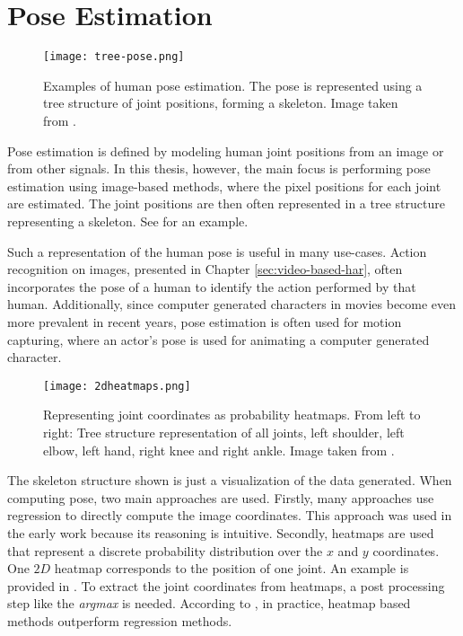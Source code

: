 \section{Pose Estimation}

\begin{figure}[htb!]
    \centering
    \texttt{[image: tree-pose.png]}
    \caption{Examples of human pose estimation. The pose is represented using a tree structure of joint positions, forming a skeleton. Image taken from \cite{newell_stacked_2016}.}
    \label{fig:tree-skeleton}
\end{figure}

Pose estimation is defined by modeling human joint positions from an image or from other signals.
In this thesis, however, the main focus is performing pose estimation using image-based methods, where the pixel positions for each joint are estimated.
The joint positions are then often represented in a tree structure representing a skeleton.
See  for an example.

Such a representation of the human pose is useful in many use-cases.
Action recognition on images, presented in Chapter \ref{sec:video-based-har}, often incorporates the pose of a human to identify the action performed by that human.
Additionally, since computer generated characters in movies become even more prevalent in recent years, pose estimation is often used for motion capturing, where an actor's pose is used for animating a computer generated character.

\begin{figure}[htb!]
    \centering
    \texttt{[image: 2dheatmaps.png]}
    \caption{Representing joint coordinates as probability heatmaps. From left to right: Tree structure representation of all joints, left shoulder, left elbow, left hand, right knee and right ankle. Image taken from \cite{newell_stacked_2016}.}
    \label{fig:probability-heatmaps}
\end{figure}

The skeleton structure shown is just a visualization of the data generated.
When computing pose, two main approaches are used.
Firstly, many approaches use regression to directly compute the image coordinates.
This approach was used in the early work because its reasoning is intuitive.
Secondly, heatmaps are used that represent a discrete probability distribution over the $x$ and $y$ coordinates.
One $2D$ heatmap corresponds to the position of one joint.
An example is provided in .
To extract the joint coordinates from heatmaps, a post processing step like the \textit{argmax} is needed.
According to \cite{luvizon_2d/3d_2018}, in practice, heatmap based methods outperform regression methods.

